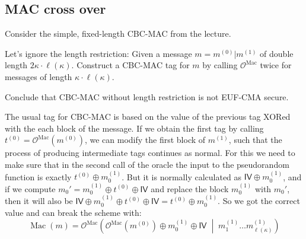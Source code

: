 \documentclass{article}
\begin{document}

  \subsection{MAC cross over}
  \begin{centerframebox}
    Consider the simple, fixed-length CBC-MAC from the lecture.

    Let's ignore the length restriction: Given a message $m = m^{(0)}|m^{(1)}$ of
    double length $2\kappa \cdot \ell(\kappa)$. Construct a CBC-MAC tag for $m$ by calling $\mathcal{O}^\mathrm{Mac}$
    twice for messages of length $\kappa \cdot \ell(\kappa)$.

    Conclude that CBC-MAC without length restriction is not EUF-CMA secure.
  \end{centerframebox}
  The usual tag for CBC-MAC is based on the value of the previous tag XORed with the each block of the message.
  If we obtain the first tag by calling $t^{(0)} = \mathcal{O}^\mathrm{Mac}\left(m^{(0)}\right)$, we can modify the first block of $m^{(1)}$,
  such that the process of producing intermediate tags continues as normal.
  For this we need to make sure that in the second call of the oracle the input to the pseudorandom function is exactly
  $t^{(0)} \oplus m^{(1)}_0$.
  But it is normally calculated as $\mathsf{IV} \oplus m^{(1)}_0$, and if we compute $m_0' = m^{(1)}_0 \oplus t^{(0)} \oplus \mathsf{IV}$
  and replace the block $m^{(1)}_0$ with $m_0'$, then it will also be $\mathsf{IV} \oplus m^{(1)}_0 \oplus t^{(0)} \oplus \mathsf{IV} = t^{(0)} \oplus m^{(1)}_0$.
  So we got the correct value and can break the scheme with:
  \[ \operatorname{Mac}(m) = \mathcal{O}^\mathrm{Mac}\left(
      \mathcal{O}^\mathrm{Mac}\left(m^{(0)}\right) \oplus m^{(1)}_0 \oplus \mathsf{IV}
      \;\middle|\;
      m^{(1)}_1 \dots m^{(1)}_{\ell(\kappa)}
  \right) \]
\end{document}
